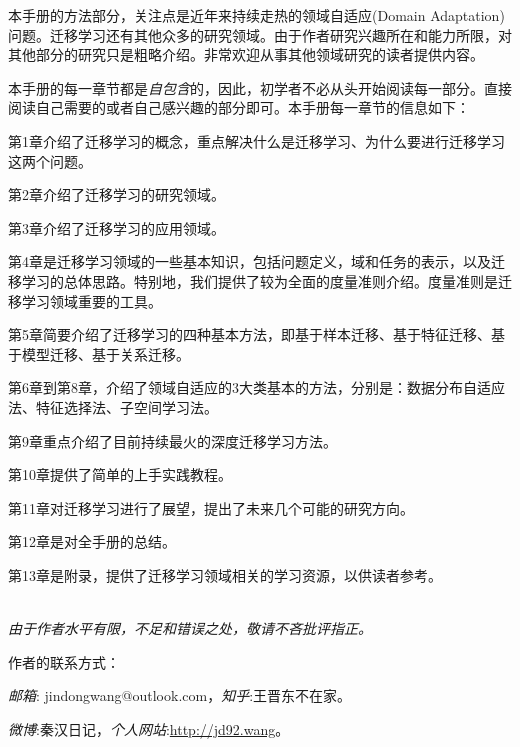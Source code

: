 本手册的方法部分，关注点是近年来持续走热的领域自适应(Domain Adaptation)问题。迁移学习还有其他众多的研究领域。由于作者研究兴趣所在和能力所限，对其他部分的研究只是粗略介绍。非常欢迎从事其他领域研究的读者提供内容。

本手册的每一章节都是\textit{自包含}的，因此，初学者不必从头开始阅读每一部分。直接阅读自己需要的或者自己感兴趣的部分即可。本手册每一章节的信息如下：

第1章介绍了迁移学习的概念，重点解决什么是迁移学习、为什么要进行迁移学习这两个问题。

第2章介绍了迁移学习的研究领域。

第3章介绍了迁移学习的应用领域。

第4章是迁移学习领域的一些基本知识，包括问题定义，域和任务的表示，以及迁移学习的总体思路。特别地，我们提供了较为全面的度量准则介绍。度量准则是迁移学习领域重要的工具。

第5章简要介绍了迁移学习的四种基本方法，即基于样本迁移、基于特征迁移、基于模型迁移、基于关系迁移。

第6章到第8章，介绍了领域自适应的3大类基本的方法，分别是：数据分布自适应法、特征选择法、子空间学习法。

第9章重点介绍了目前持续最火的深度迁移学习方法。

第10章提供了简单的上手实践教程。

第11章对迁移学习进行了展望，提出了未来几个可能的研究方向。

第12章是对全手册的总结。

第13章是附录，提供了迁移学习领域相关的学习资源，以供读者参考。

\textit{\\由于作者水平有限，不足和错误之处，敬请不吝批评指正。}

作者的联系方式：

\textit{邮箱}: {\ttfamily jindongwang@outlook.com}，\textit{知乎}:{\ttfamily 王晋东不在家}。

\textit{微博}:{\ttfamily 秦汉日记}，\textit{个人网站}:\url{http://jd92.wang}。
